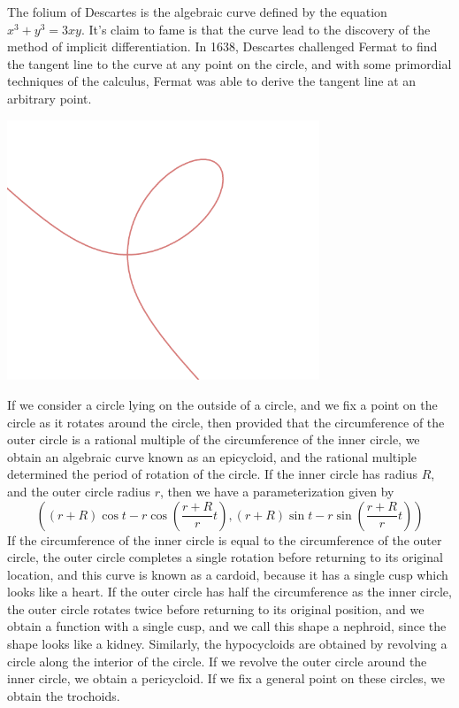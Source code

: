 \begin{example}
    The folium of Descartes is the algebraic curve defined by the equation $x^3 + y^3 = 3xy$. It's claim to fame is that the curve lead to the discovery of the method of implicit differentiation. In 1638, Descartes challenged Fermat to find the tangent line to the curve at any point on the circle, and with some primordial techniques of the calculus, Fermat was able to derive the tangent line at an arbitrary point.
    \begin{center}
        \includegraphics[width=0.7\textwidth]{FoliumDescartes.png}
    \end{center}
\end{example}

\begin{example}
    If we consider a circle lying on the outside of a circle, and we fix a point on the circle as it rotates around the circle, then provided that the circumference of the outer circle is a rational multiple of the circumference of the inner circle, we obtain an algebraic curve known as an epicycloid, and the rational multiple determined the period of rotation of the circle. If the inner circle has radius $R$, and the outer circle radius $r$, then we have a parameterization given by
    \[ \left( (r + R) \cos t - r \cos \left(\frac{r + R}{r}t \right), (r + R) \sin t - r \sin \left( \frac{r + R}{r}t \right) \right) \]
    If the circumference of the inner circle is equal to the circumference of the outer circle, the outer circle completes a single rotation before returning to its original location, and this curve is known as a cardoid, because it has a single cusp which looks like a heart. If the outer circle has half the circumference as the inner circle, the outer circle rotates twice before returning to its original position, and we obtain a function with a single cusp, and we call this shape a nephroid, since the shape looks like a kidney. Similarly, the hypocycloids are obtained by revolving a circle along the interior of the circle. If we revolve the outer circle around the inner circle, we obtain a pericycloid. If we fix a general point on these circles, we obtain the trochoids.
\end{example}

